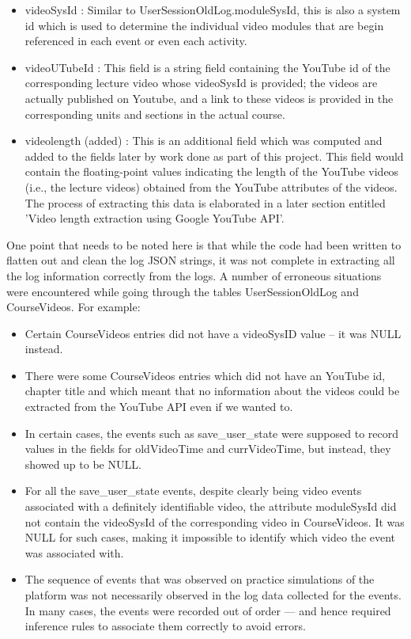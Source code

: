 \documentclass[16pt]{report}
\begin{document}
\begin{itemize}
\begin{itemize}
\item videoSysId : Similar to UserSessionOldLog.moduleSysId, this is also a system id which is used to determine the individual video modules that are begin referenced in each event or even each activity.
\item videoUTubeId : This field is a string field containing the YouTube id of the corresponding lecture video whose videoSysId is provided; the videos are actually published on Youtube, and a link to these videos is provided in the corresponding units and sections in the actual course.
\item videolength (added) : This is an additional field which was computed and added to the fields later by work done as part of this project. This field would contain the floating-point values indicating the length of the YouTube videos (i.e., the lecture videos) obtained from the YouTube attributes of the videos. The process of extracting this data is elaborated in a later section entitled 'Video length extraction using Google YouTube API'.
\end{itemize}

\end{itemize}


One point that needs to be noted here is that while the code had been written to flatten out and clean the log JSON strings, it was not complete in extracting all the log information correctly from the logs. A number of erroneous situations were encountered while going through the tables UserSessionOldLog and CourseVideos. For example:

\begin{itemize}
\item Certain CourseVideos entries did not have a videoSysID value -- it was NULL instead.

\item There were some CourseVideos entries which did not have an YouTube id, chapter title and which meant that no information about the videos could be extracted from the YouTube API even if we wanted to.

\item In certain cases, the events such as save\_user\_state were supposed to record values in the fields for oldVideoTime and currVideoTime, but instead, they showed up to be NULL.

\item For all the save\_user\_state events, despite clearly being video events associated with a definitely identifiable video, the attribute moduleSysId did not contain the videoSysId of the corresponding video in CourseVideos. It was NULL for such cases, making it impossible to identify which video the event was associated with.

\item The sequence of events that was observed on practice simulations of the platform was not necessarily observed in the log data collected for the events. In many cases, the events were recorded out of order --- and hence required inference rules to associate them correctly to avoid errors.

\end{itemize}
\end{document}
